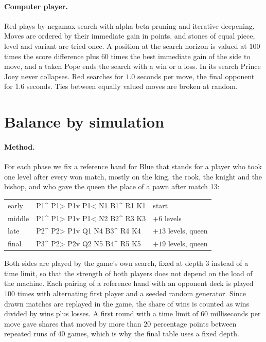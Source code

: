 \documentclass[11pt,a4paper]{article}
\begin{document}
\paragraph{Computer player.} Red plays by negamax search with alpha-beta pruning and iterative deepening. Moves are ordered by their immediate gain in points, and stones of equal piece, level and variant are tried once. A position at the search horizon is valued at $100$ times the score difference plus $60$ times the best immediate gain of the side to move, and a taken Pope ends the search with a win or a loss. In its search Prince Joey never collapses. Red searches for $1.0$ seconds per move, the final opponent for $1.6$ seconds. Ties between equally valued moves are broken at random.

\section{Balance by simulation}\label{sec:balance}

\paragraph{Method.} For each phase we fix a reference hand for Blue that stands for a player who took one level after every won match, mostly on the king, the rook, the knight and the bishop, and who gave the queen the place of a pawn after match 13:
\begin{center}
\begin{tabular}{lll}
early & P1\^{} P1> P1v P1< N1 B1\^{} R1 K1 & start \\
middle & P1\^{} P1> P1v P1< N2 B2\^{} R3 K3 & $+6$ levels \\
late & P2\^{} P2> P1v Q1 N4 B3\^{} R4 K4 & $+13$ levels, queen \\
final & P3\^{} P2> P2v Q2 N5 B4\^{} R5 K5 & $+19$ levels, queen \\
\end{tabular}
\end{center}
Both sides are played by the game's own search, fixed at depth $3$ instead of a time limit, so that the strength of both players does not depend on the load of the machine. Each pairing of a reference hand with an opponent deck is played $100$ times with alternating first player and a seeded random generator. Since drawn matches are replayed in the game, the share of wins is counted as wins divided by wins plus losses. A first round with a time limit of $60$ milliseconds per move gave shares that moved by more than $20$ percentage points between repeated runs of $40$ games, which is why the final table uses a fixed depth.
\end{document}

